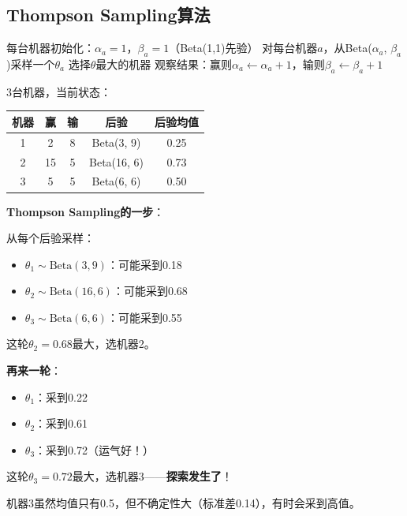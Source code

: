 \documentclass[11pt,a4paper]{article}
\theoremstyle{definition}
\begin{document}
\subsection{Thompson Sampling算法}

\begin{algorithm}[H]
\caption{Thompson Sampling}
\begin{algorithmic}[1]
\State 每台机器初始化：$\alpha_a = 1$，$\beta_a = 1$（Beta(1,1)先验）
    \State 对每台机器$a$，从Beta($\alpha_a$, $\beta_a$)采样一个$\theta_a$
    \State 选择$\theta$最大的机器
    \State 观察结果：赢则$\alpha_a \leftarrow \alpha_a + 1$，输则$\beta_a \leftarrow \beta_a + 1$
\EndFor
\end{algorithmic}
\end{algorithm}

\begin{calculation}
3台机器，当前状态：

\begin{center}
\begin{tabular}{c|c|c|c|c}
\toprule
机器 & 赢 & 输 & 后验 & 后验均值 \\
\midrule
1 & 2 & 8 & Beta(3, 9) & 0.25 \\
2 & 15 & 5 & Beta(16, 6) & 0.73 \\
3 & 5 & 5 & Beta(6, 6) & 0.50 \\
\bottomrule
\end{tabular}
\end{center}

\textbf{Thompson Sampling的一步}：

从每个后验采样：
\begin{itemize}
    \item $\theta_1 \sim \text{Beta}(3, 9)$：可能采到0.18
    \item $\theta_2 \sim \text{Beta}(16, 6)$：可能采到0.68
    \item $\theta_3 \sim \text{Beta}(6, 6)$：可能采到0.55
\end{itemize}

这轮$\theta_2 = 0.68$最大，选机器2。

\textbf{再来一轮}：
\begin{itemize}
    \item $\theta_1$：采到0.22
    \item $\theta_2$：采到0.61
    \item $\theta_3$：采到0.72（运气好！）
\end{itemize}

这轮$\theta_3 = 0.72$最大，选机器3——\textbf{探索发生了}！

机器3虽然均值只有0.5，但不确定性大（标准差0.14），有时会采到高值。
\end{calculation}
\end{document}
